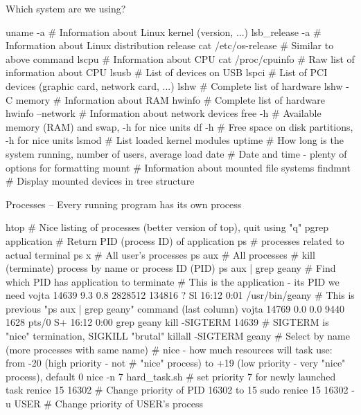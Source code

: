 \documentclass[compress, ucs, xelatex, 11pt, xcolor=svgnames,
  hyperref={
    bookmarks=true,
    unicode=true,
    colorlinks=true,
    pdftitle={Linux, command line and MetaCentrum},
    plainpages=false,
    pdfauthor={Vojtech Zeisek},
    pdfsubject={Course about use of Linux command line, writing shell scripts and using MetaCentrum of CESNET},
    pdfcreator={XeLaTeX},
    pdfkeywords={Linux, GNU, BASH, shell, command line, MetaCentrum},
    linkcolor=Red,
    anchorcolor=Blue,
    citecolor=Purple,
    filecolor=DodgerBlue,
    menucolor=DarkOrchid,
    urlcolor=DeepSkyBlue,
    pdftex},
  url={hyphens, lowtilde} %
  ]{beamer}
\begin{document}
\begin{frame}[fragile]{Which system are we using?}
  \begin{bashcode}
    uname -a # Information about Linux kernel (version, ...)
    lsb_release -a # Information about Linux distribution release
    cat /etc/os-release # Similar to above command
    lscpu # Information about CPU
    cat /proc/cpuinfo # Raw list of information about CPU
    lsusb # List of devices on USB
    lspci # List of PCI devices (graphic card, network card, ...)
    lshw # Complete list of hardware
    lshw -C memory # Information about RAM
    hwinfo # Complete list of hardware
    hwinfo --network # Information about network devices
    free -h # Available memory (RAM) and swap, -h for nice units
    df -h # Free space on disk partitions, -h for nice units
    lsmod # List loaded kernel modules
    uptime # How long is the system running, number of users, average load
    date # Date and time - plenty of options for formatting
    mount # Information about mounted file systems
    findmnt # Display mounted devices in tree structure
  \end{bashcode}
\end{frame}

\begin{frame}[fragile]{Processes -- Every running program has its own process}
  \begin{bashcode}
    htop # Nice listing of processes (better version of top), quit using "q"
    pgrep application # Return PID (process ID) of application
    ps # processes related to actual terminal
    ps x # All user's processes
    ps aux # All processes
    # kill (terminate) process by name or process ID (PID)
    ps aux | grep geany # Find which PID has application to terminate
    # This is the application - its PID we need
    vojta 14639 9.3 0.8 2828512 134816 ?   Sl 16:12 0:01 /usr/bin/geany
    # This is previous "ps aux | grep geany" command (last column)
    vojta 14769 0.0 0.0   9440  1628 pts/0 S+ 16:12 0:00 grep geany
    kill -SIGTERM 14639 # SIGTERM is "nice" termination, SIGKILL "brutal"
    killall -SIGTERM geany # Select by name (more processes with same name)
    # nice - how much resources will task use: from -20 (high priority - not
    # "nice" process) to +19 (low priority - very "nice" process), default 0
    nice -n 7 hard_task.sh # set priority 7 for newly launched task
    renice 15 16302 # Change priority of PID 16302 to 15
    sudo renice 15 16302 -u USER # Change priority of USER's process
  \end{bashcode}
\end{frame}
\end{document}

